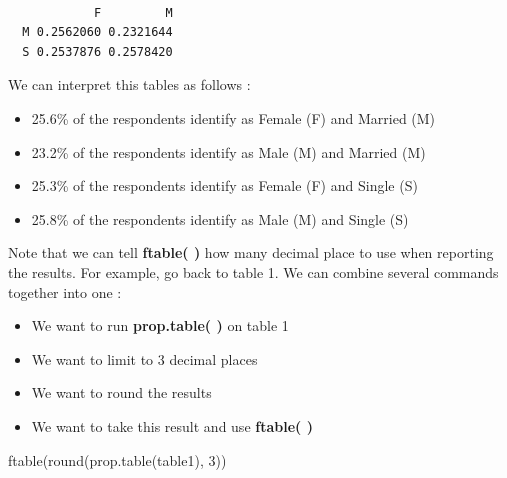 \documentclass[
  letterpaper,
  DIV=11,
  numbers=noendperiod]{scrreprt}
\newenvironment{Shaded}{\begin{snugshade}}{\end{snugshade}}
\newcommand{\AttributeTok}[1]{\textcolor[rgb]{0.40,0.45,0.13}{#1}}
\newcommand{\CommentTok}[1]{\textcolor[rgb]{0.37,0.37,0.37}{#1}}
\newcommand{\DecValTok}[1]{\textcolor[rgb]{0.68,0.00,0.00}{#1}}
\newcommand{\FunctionTok}[1]{\textcolor[rgb]{0.28,0.35,0.67}{#1}}
\newcommand{\NormalTok}[1]{\textcolor[rgb]{0.00,0.23,0.31}{#1}}
\newcommand{\OtherTok}[1]{\textcolor[rgb]{0.00,0.23,0.31}{#1}}
\newcommand{\SpecialCharTok}[1]{\textcolor[rgb]{0.37,0.37,0.37}{#1}}
\newcommand{\StringTok}[1]{\textcolor[rgb]{0.13,0.47,0.30}{#1}}
\providecommand{\tightlist}{%
  \setlength{\itemsep}{0pt}\setlength{\parskip}{0pt}}\usepackage{longtable,booktabs,array}
\begin{document}
\begin{Shaded}
\end{Shaded}

\begin{verbatim}
   
            F         M
  M 0.2562060 0.2321644
  S 0.2537876 0.2578420
\end{verbatim}

We can interpret this tables as follows :

\begin{itemize}
\tightlist
\item
  25.6\% of the respondents identify as Female (F) and Married (M)
\item
  23.2\% of the respondents identify as Male (M) and Married (M)
\item
  25.3\% of the respondents identify as Female (F) and Single (S)
\item
  25.8\% of the respondents identify as Male (M) and Single (S)
\end{itemize}

Note that we can tell \textbf{ftable( )} how many decimal place to use
when reporting the results. For example, go back to table 1. We can
combine several commands together into one :

\begin{itemize}
\tightlist
\item
  We want to run \textbf{prop.table( )} on table 1
\item
  We want to limit to 3 decimal places
\item
  We want to round the results
\item
  We want to take this result and use \textbf{ftable( )}
\end{itemize}

\begin{Shaded}
\begin{Highlighting}[]
\FunctionTok{ftable}\NormalTok{(}\FunctionTok{round}\NormalTok{(}\FunctionTok{prop.table}\NormalTok{(table1), }\DecValTok{3}\NormalTok{))}
\end{Highlighting}
\end{Shaded}
\end{document}
